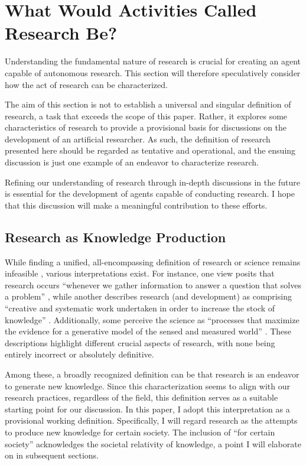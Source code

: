 \section{What Would Activities Called Research Be?}
\label{section-what-is-research}

Understanding the fundamental nature of research is crucial for creating an agent capable of autonomous research. This section will therefore speculatively consider how the act of research can be characterized.

The aim of this section is not to establish a universal and singular definition of research, a task that exceeds the scope of this paper. Rather, it explores some characteristics of research to provide a provisional basis for discussions on the development of an artificial researcher. As such, the definition of research presented here should be regarded as tentative and operational, and the ensuing discussion is just one example of an endeavor to characterize research. 

Refining our understanding of research through in-depth discussions in the future is essential for the development of agents capable of conducting research. I hope that this discussion will make a meaningful contribution to these efforts.

\subsection{Research as Knowledge Production}

While finding a unified, all-encompassing definition of research or science remains infeasible \cite{chalmers2013thing,sep-scientific-method}, various interpretations exist. For instance, one view posits that research occurs ``whenever we gather information to answer a question that solves a problem'' \cite{booth2003craft}, while another describes research (and development) as comprising ``creative and systematic work undertaken in order to increase the stock of knowledge'' \cite{manual2015guidelines}. Additionally, some perceive the science as ``processes that maximize the evidence for a generative model of the sensed and measured world'' \cite{balzandistributed}. These descriptions highlight different crucial aspects of research, with none being entirely incorrect or absolutely definitive.

Among these, a broadly recognized definition can be that research is an endeavor to generate new knowledge. Since this characterization seems to align with our research practices, regardless of the field, this definition serves as a suitable starting point for our discussion. In this paper, I adopt this interpretation as a provisional working definition. Specifically, I will regard research as the attempts to produce new knowledge for certain society. The inclusion of ``for certain society'' acknowledges the societal relativity of knowledge, a point I will elaborate on in subsequent sections.


